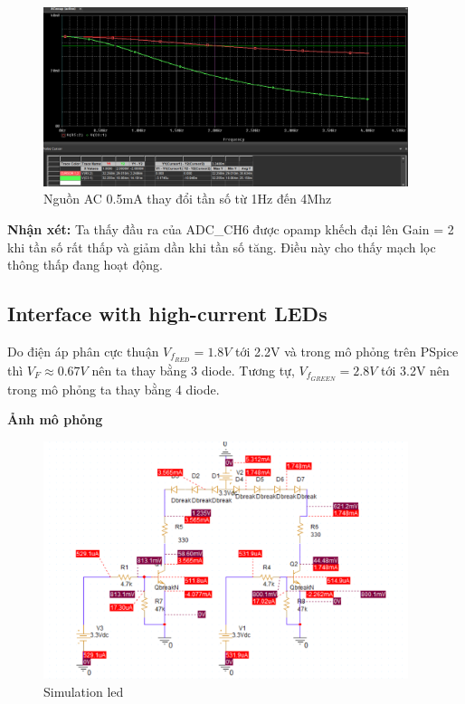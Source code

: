 \begin{figure}[ht]
    \centering
    \includegraphics[width=0.95\textwidth]{graphics/section4/f7.png}
    \caption{Nguồn AC 0.5mA thay đổi tần số từ 1Hz đến 4Mhz}
\end{figure}

\textbf{Nhận xét:} Ta thấy đầu ra của ADC\_CH6 được opamp khếch đại lên Gain = 2 khi tần số rất thấp và giảm dần khi tần số tăng. Điều này cho thấy mạch lọc thông thấp đang hoạt động.

\pagebreak
\subsection{Interface with high-current LEDs}
Do điện áp phân cực thuận $V_{f_{RED}} = 1.8V$ tới 2.2V và trong mô phỏng trên PSpice thì $V_F \approx 0.67 V$ nên ta thay bằng 3 diode.
Tương tự, $V_{f_{GREEN}} = 2.8V$ tới 3.2V nên trong mô phỏng ta thay bằng 4 diode.

\textbf{Ảnh mô phỏng}

\begin{figure}[ht]
    \centering
    \includegraphics[width=0.95\textwidth]{graphics/section4/f5.png}
    \caption{Simulation led}
\end{figure}


